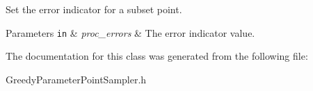 Set the error indicator for a subset point. 


\begin{DoxyParams}[1]{Parameters}
\mbox{\tt in}  & {\em proc\-\_\-errors} & The error indicator value. \\
\hline
\end{DoxyParams}


The documentation for this class was generated from the following file\-:\begin{DoxyCompactItemize}
\item 
Greedy\-Parameter\-Point\-Sampler.\-h\end{DoxyCompactItemize}
